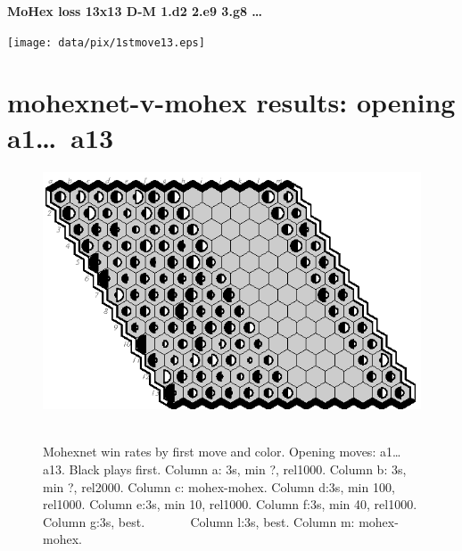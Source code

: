 \documentclass{article}
\begin{document}
{\large\bf MoHex loss 13x13 D-M 1.d2 2.e9 3.g8 \ldots}
\vfill

\texttt{[image: data/pix/1stmove13.eps]}\vfill\vfill\vfill~
\newpage
\section*{mohexnet-v-mohex results: opening a1\ldots\ a13}
\begin{figure}[hb]
\includegraphics[scale=2]{data/pix2/mnt-mx.eps}\vfill\vfill\vfill~
\caption{Mohexnet win rates by first move and color. Opening moves: a1\ldots a13. Black plays first. 
Column a: 3s, min ?, rel1000.
Column b: 3s, min ?, rel2000. 
Column c: mohex-mohex. 
Column d:3s, min 100, rel1000.
Column e:3s, min 10, rel1000. 
Column f:3s, min 40, rel1000.
Column g:3s, best. ~ ~ ~ ~ 
Column l:3s, best.
Column m: mohex-mohex.}
\end{figure}
\end{document}
